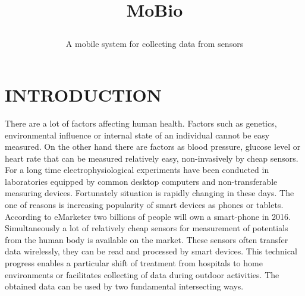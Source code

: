 \documentclass[a4paper,twoside]{article}
\begin{document}
\title{MoBio\subtitle{A mobile system for collecting data from sensors} }

\author{
}   



\onecolumn \maketitle \normalsize \vfill

\section{\uppercase{Introduction}}
\label{sec:introduction}

\noindent 
There are a lot of factors affecting human health. Factors such as genetics, environmental influence or internal state of an individual cannot be easy measured. On the other hand there are factors as blood pressure, glucose level or heart rate that can be measured relatively easy, non-invasively by cheap sensors. For a long time electrophysiological experiments have been conducted in laboratories equipped by common desktop computers and non-transferable measuring devices. Fortunately situation is rapidly changing in these days. The one of reasons is increasing popularity of smart devices as phones or tablets. According to eMarketer \cite{emark} two billions of people will own a smart-phone in 2016. Simultaneously a lot of relatively cheap sensors for measurement of potentials from the human body is available on the market. These sensors often transfer data wirelessly, they can be read and processed by smart devices. This technical progress enables a particular shift of treatment from hospitals to home environments or facilitates collecting of data during outdoor activities. The obtained data can be used by two fundamental intersecting ways. 
\end{document}
